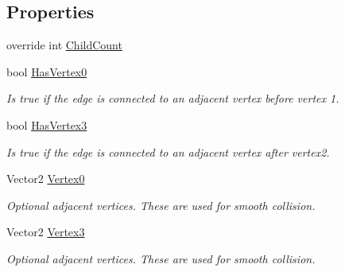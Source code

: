 \subsection*{Properties}
\begin{DoxyCompactItemize}
\item 
override int \hyperlink{class_farseer_physics_1_1_collision_1_1_shapes_1_1_edge_shape_a5ba41fb62b70f922e5788da66fc57966}{Child\+Count}
\item 
bool \hyperlink{class_farseer_physics_1_1_collision_1_1_shapes_1_1_edge_shape_aca9b7fb05abe297942d8138636ec3e6b}{Has\+Vertex0}
\begin{DoxyCompactList}\small\item\em Is true if the edge is connected to an adjacent vertex before vertex 1. \end{DoxyCompactList}\item 
bool \hyperlink{class_farseer_physics_1_1_collision_1_1_shapes_1_1_edge_shape_ae7172745696408f3a1e1ddd3634b590b}{Has\+Vertex3}
\begin{DoxyCompactList}\small\item\em Is true if the edge is connected to an adjacent vertex after vertex2. \end{DoxyCompactList}\item 
Vector2 \hyperlink{class_farseer_physics_1_1_collision_1_1_shapes_1_1_edge_shape_a44ddded5e9dd14566c2ba3c93fbf0924}{Vertex0}
\begin{DoxyCompactList}\small\item\em Optional adjacent vertices. These are used for smooth collision. \end{DoxyCompactList}\item 
Vector2 \hyperlink{class_farseer_physics_1_1_collision_1_1_shapes_1_1_edge_shape_a636e6dc7a6a13eefadd4e20056a19f79}{Vertex3}
\begin{DoxyCompactList}\small\item\em Optional adjacent vertices. These are used for smooth collision. \end{DoxyCompactList}\item 

\end{DoxyCompactItemize}
